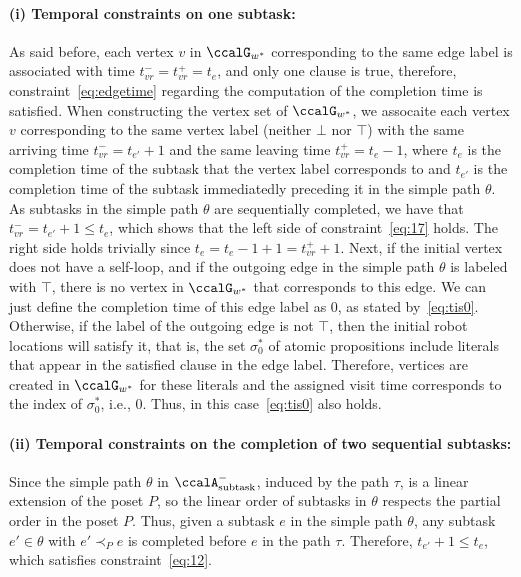 \documentclass[Afour,sageh,times]{sagej}
\newcommand{\auto}[1]{\ccalA_{\textup{#1}}}
\begin{document}
{{\paragraph{(i) Temporal constraints on one subtask:} As said before, each vertex $v$ in $\ccalG_{w^*}$ corresponding to the same edge label is associated with time $t_{vr}^- = t_{vr}^+ = t_e$, and only one clause is true, therefore, constraint~\eqref{eq:edgetime} regarding the computation of the completion time is satisfied. When constructing the vertex set of $\ccalG_{w^*}$, we assocaite each vertex $v$ corresponding to the same vertex label (neither $\bot$ nor $\top$) with the same arriving time $t_{vr}^- = t_{e'}+1$ and the same leaving time $t_{vr}^+ = t_{e}-1$, where $t_e$ is the completion time of the subtask that the vertex label corresponds to and $t_{e'}$ is the completion time of the subtask immediatedly preceding it in the simple path $\theta$. As subtasks in  the simple path $\theta$ are sequentially completed, we have that $t_{vr}^- = t_{e'}+1\leq t_e$, which shows that the left side of constraint~\eqref{eq:17} holds. The right side holds trivially since $t_e = t_e-1+1 = t_{vr}^+ +1$. Next, if the initial vertex does not have a self-loop, and if the outgoing edge in the simple path $\theta$ is labeled with $\top$, there is no vertex in $\ccalG_{w^*}$ that corresponds to this edge. We can just define the completion time of this edge label as 0, as stated by~\eqref{eq:tis0}. Otherwise, if the label of the outgoing edge is not $\top$, then the initial robot locations will satisfy it, that is, the set $\sigma^*_0$ of atomic propositions include literals that appear in the satisfied clause in the edge label.
Therefore, vertices are created in $\ccalG_{w^*}$ for these literals and the assigned visit time corresponds to the index of $\sigma_0^*$, i.e., 0. Thus, in this case~\eqref{eq:tis0} also holds.

\paragraph{(ii) Temporal constraints on the completion of two sequential subtasks:}
Since the simple path $\theta$ in $\auto{subtask}^-$, induced by the path $\tau$, is a linear extension of the poset $P$, so the linear order of subtasks in $\theta$ respects the partial order in the poset $P$. Thus, given a subtask $e$ in the simple path $\theta$, any subtask $e'\in \theta$ with $e' \prec_P e$ is completed before $e$ in the path $\tau$. Therefore, $t_{e'} +1 \leq t_e$, which satisfies constraint~\eqref{eq:12}.
}}
\end{document}
